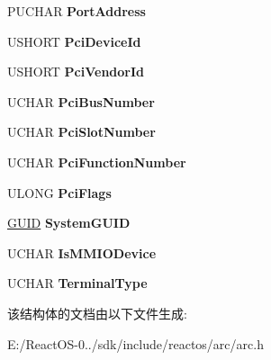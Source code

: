 \begin{DoxyCompactItemize}
P\+U\+C\+H\+AR {\bfseries Port\+Address}
\item 
\mbox{\label{struct___h_e_a_d_l_e_s_s___l_o_a_d_e_r___b_l_o_c_k_ab27ff83c072e8b56c70650d761c30d44}} 
U\+S\+H\+O\+RT {\bfseries Pci\+Device\+Id}
\item 
\mbox{\label{struct___h_e_a_d_l_e_s_s___l_o_a_d_e_r___b_l_o_c_k_aa3406b604056fdc2956a6090411a5266}} 
U\+S\+H\+O\+RT {\bfseries Pci\+Vendor\+Id}
\item 
\mbox{\label{struct___h_e_a_d_l_e_s_s___l_o_a_d_e_r___b_l_o_c_k_ac435f1de1e81af76210f443ff16fcb0b}} 
U\+C\+H\+AR {\bfseries Pci\+Bus\+Number}
\item 
\mbox{\label{struct___h_e_a_d_l_e_s_s___l_o_a_d_e_r___b_l_o_c_k_a1c28e26131666bc09170d0330cbbcace}} 
U\+C\+H\+AR {\bfseries Pci\+Slot\+Number}
\item 
\mbox{\label{struct___h_e_a_d_l_e_s_s___l_o_a_d_e_r___b_l_o_c_k_af01d5e5003ad95bd4d94a2d786fd9a11}} 
U\+C\+H\+AR {\bfseries Pci\+Function\+Number}
\item 
\mbox{\label{struct___h_e_a_d_l_e_s_s___l_o_a_d_e_r___b_l_o_c_k_af4a76e0512b63840da197d929e49d84a}} 
U\+L\+O\+NG {\bfseries Pci\+Flags}
\item 
\mbox{\label{struct___h_e_a_d_l_e_s_s___l_o_a_d_e_r___b_l_o_c_k_a4626bf641ee5824a420158e971ea3019}} 
\hyperlink{interface_g_u_i_d}{G\+U\+ID} {\bfseries System\+G\+U\+ID}
\item 
\mbox{\label{struct___h_e_a_d_l_e_s_s___l_o_a_d_e_r___b_l_o_c_k_a0ba71884646c2364eb5aca947e8cea0a}} 
U\+C\+H\+AR {\bfseries Is\+M\+M\+I\+O\+Device}
\item 
\mbox{\label{struct___h_e_a_d_l_e_s_s___l_o_a_d_e_r___b_l_o_c_k_af13110471a312628a2e1574060f026a0}} 
U\+C\+H\+AR {\bfseries Terminal\+Type}
\end{DoxyCompactItemize}


该结构体的文档由以下文件生成\+:\begin{DoxyCompactItemize}
\item 
E\+:/\+React\+O\+S-\/0../sdk/include/reactos/arc/arc.\+h\end{DoxyCompactItemize}
